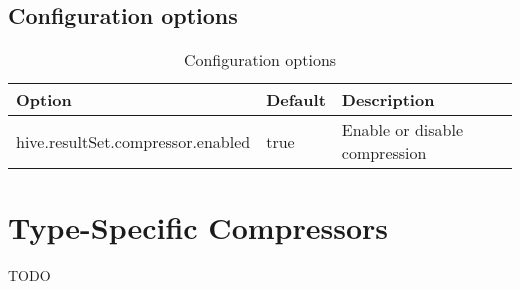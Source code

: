 \documentclass[11pt,a4paper]{article}
\begin{document}
		
	\subsection{Configuration options}
	\begin{table}[!h]
		\begin{tabular}{| l | l | p{4cm} |} \hline
			\textbf{Option} & \textbf{Default} & \textbf{Description} \\ \hline
			hive.resultSet.compressor.enabled & true & Enable or disable compression \\ \hline
		\end{tabular}
		\caption{Configuration options}
	\end{table}

\section{Type-Specific Compressors}
	TODO
\end{document}
